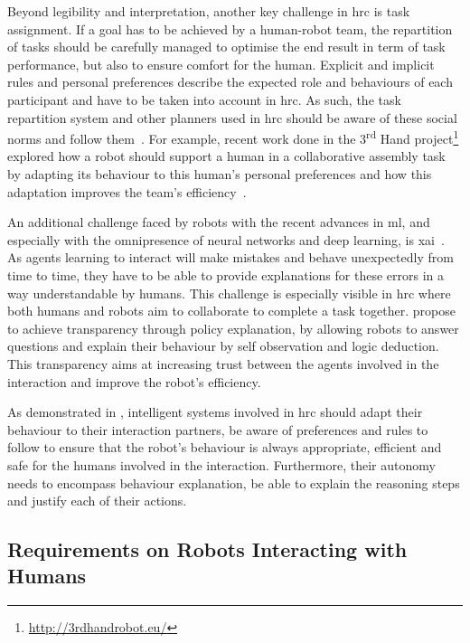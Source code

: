 	Beyond legibility and interpretation, another key challenge in \gls{hrc} is task assignment. If a goal has to be achieved by a human-robot team, the repartition of tasks should be carefully managed to  optimise the end result in term of task performance, but also to ensure comfort for the human. Explicit and implicit rules and personal preferences describe the expected role and behaviours of each participant and have to be taken into account in \gls{hrc}. As such, the task repartition system and other planners used in \gls{hrc} should be aware of these social norms and follow them~\citep{montreuil2007planning}. For example, recent work done in the 3\textsuperscript{rd} Hand project\footnote{\url{http://3rdhandrobot.eu/}} explored how a robot should support a human in a collaborative assembly task by adapting its behaviour to this human's personal preferences and how this adaptation improves the team's efficiency~\citep{munzer2017efficient}.
	
	An additional challenge faced by robots with the recent advances in \gls{ml}, and especially with the omnipresence of neural networks and deep learning, is \gls{xai}~\citep{wachter2017transparent}. As agents learning to interact will make mistakes and behave unexpectedly from time to time, they have to be able to provide explanations for these errors in a way understandable by humans. This challenge is especially visible in \gls{hrc} where both humans and robots aim to collaborate to complete a task together. \cite{hayes2017improving} propose to achieve transparency through policy explanation, by allowing robots to answer questions and explain their behaviour by self observation and logic deduction. This transparency aims at increasing trust between the agents involved in the interaction and improve the robot's efficiency.
	
	As demonstrated in \cite{munzer2017efficient}, intelligent systems involved in \gls{hrc} should adapt their behaviour to their interaction partners, be aware of preferences and rules to follow to ensure that the robot's behaviour is always appropriate, efficient and safe for the humans involved in the interaction. Furthermore, their autonomy needs to encompass behaviour explanation, be able to explain the reasoning steps and justify each of their actions.

\subsection{Requirements on Robots Interacting with Humans} \label{ssec:back_constraints}

